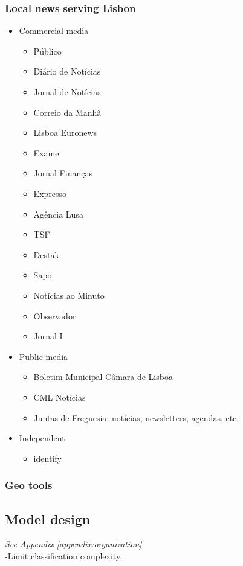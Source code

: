 \subsubsection{Local news serving Lisbon}
\begin{itemize}
	\item Commercial media
	\begin{itemize}
		\item Público
		\item Diário de Notícias
		\item Jornal de Notícias
		\item Correio da Manhã
		\item Lisboa Euronews
		\item Exame
		\item Jornal Finanças
		\item Expresso
		\item Agência Lusa
		\item TSF
		\item Destak
		\item Sapo
		\item Notícias ao Minuto
		\item Observador
		\item Jornal I
	\end{itemize}
	\item Public media
	\begin{itemize}
		\item Boletim Municipal Câmara de Lisboa
		\item CML Notícias
		\item Juntas de Freguesia: notícias, newsletters, agendas, etc.
	\end{itemize}
	\item Independent
	\begin{itemize}
		\item {\color{red}identify}
	\end{itemize}
\end{itemize}
	
\subsubsection{Geo tools}

\subsection{Model design}
\textit{See Appendix \ref{appendix:organization}}\\
-{\color{orange}Limit classification complexity. \cite{Jiang2020}}\\


